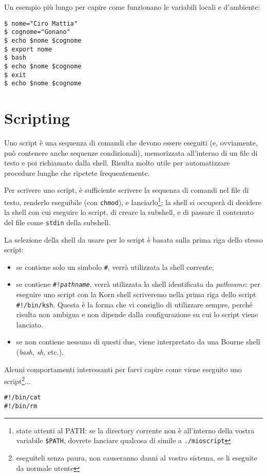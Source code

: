 Un esempio pi\`u lungo per capire come funzionano le variabili locali e
d'ambiente:
\begin{verbatim}
$ nome="Ciro Mattia"
$ cognome="Gonano"
$ echo $nome $cognome
$ export nome
$ bash
$ echo $nome $cognome
$ exit
$ echo $nome $cognome
\end{verbatim}

\section{Scripting}
Uno script \`e una sequenza di comandi che devono essere eseguiti (e,
ovviamente, pu\`o contenere anche sequenze condizionali), memorizzata
all'interno di un file di testo e poi richiamato dalla shell.
Risulta molto utile per automatizzare procedure lunghe che ripetete
frequentemente.

Per scrivere uno script, \`e sufficiente scrivere la sequenza di comandi nel
file di testo, renderlo eseguibile (con \texttt{chmod}), e
lanciarlo\footnote{state attenti al PATH: se la directory corrente non \`e
all'interno della vostra variabile \texttt{\$PATH}, dovrete lanciare qualcosa
di simile a \texttt{./mioscript}}; la shell si occuper\`a di decidere la shell
con cui eseguire lo script, di creare la subshell, e di passare il contenuto
del file come \texttt{stdin} della subshell.

La selezione della shell da usare per lo script \`e basata sulla prima riga
dello stesso script:
\begin{itemize}
	\item se contiene solo un simbolo \texttt{\#}, verr\`a utilizzata la
		shell corrente;
	\item se contiene \texttt{\#!\textit{pathname}}, verr\`a utilizzata la
		shell identificata da \textit{pathname}: per eseguire uno
		script con la Korn shell scriveremo nella prima riga dello
		script \texttt{\#!/bin/ksh}. Questa \`e la forma che vi
		consiglio di utilizzare sempre, perch\'e risulta non ambigua e
		non dipende dalla configurazione su cui lo script viene
		lanciato.
	\item se non contiene nessuno di questi due, viene interpretato da una
		Bourne shell (\emph{bash}, \emph{sh}, etc.).
\end{itemize}
Alcuni comportamenti interessanti per farvi capire come viene eseguito uno
script\footnote{eseguiteli senza paura, non causeranno danni al vostro
sistema, se li eseguite da normale utente}...
\begin{verbatim}
#!/bin/cat
#!/bin/rm
\end{verbatim}

